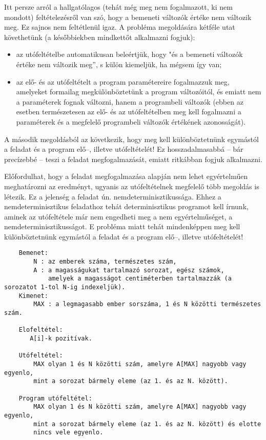 \documentclass[margin=0px]{article}
\begin{document}
	Itt persze arról a hallgatólagos (tehát még meg nem fogalmazott, ki nem mondott) feltételezésről van szó, hogy a bemeneti változók értéke nem változik meg. Ez sajnos nem feltétlenül igaz. A probléma megoldására kétféle utat követhetünk (a későbbiekben mindkettőt alkalmazni fogjuk):
	
	\begin{itemize}
		\item	az utófeltételbe automatikusan beleértjük, hogy "és a bemeneti változók értéke nem változik meg”, s külön kiemeljük, ha mégsem így van;
		\item az elő- és az utófeltételt a program paramétereire fogalmazzuk meg, amelyeket formailag megkülönböztetünk a program változóitól, és emiatt nem a paraméterek fognak változni, hanem a programbeli változók (ebben az esetben természetesen az elő- és az utófeltételben meg kell fogalmazni a paraméterek és a megfelelő programbeli változók értékének azonosságát).
	\end{itemize}

	A második megoldásból az következik, hogy meg kell különböztetnünk egymástól a feladat és a program elő–, illetve utófeltételét! Ez hosszadalmasabbá – bár precízebbé – teszi a feladat megfogalmazását, emiatt ritkábban fogjuk alkalmazni.
	
	Előfordulhat, hogy a feladat megfogalmazása alapján nem lehet egyértelműen meghatározni az eredményt, ugyanis az utófeltételnek megfelelő több megoldás is létezik. Ez a jelenség a feladat ún. nemdeterminisztikussága. Ehhez a nemdeterminisztikus feladathoz tehát determinisztikus programot kell írnunk, aminek az utófeltétele már nem engedheti meg a nem egyértelműséget, a nemdeterminisztikusságot. E probléma miatt tehát mindenképpen meg kell különböztetnünk egymástól a feladat és a program elő–, illetve utófeltételét!
	
	\begin{verbatim}
	Bemenet: 
    	N : az emberek száma, természetes szám,
    	A : a magasságukat tartalmazó sorozat, egész számok, 
        	amelyek a magasságot centiméterben tartalmazzák (a sorozatot 1-tol N-ig indexeljük).
	Kimenet:	
    	MAX : a legmagasabb ember sorszáma, 1 és N közötti természetes szám.
	
	Elofeltétel: 
	   A[i]-k pozitívak.
	
   	Utófeltétel: 	
     	MAX olyan 1 és N közötti szám, amelyre A[MAX] nagyobb vagy egyenlo, 	
	    mint a sorozat bármely eleme (az 1. és az N. között).
	    
	Program utófeltétel: 	
	   	MAX olyan 1 és N közötti szám, amelyre A[MAX] nagyobb vagy egyenlo, 	
	   	mint a sorozat bármely eleme (az 1. és az N. között) és elotte
	   	nincs vele egyenlo.
	\end{verbatim}
	
\end{document}
